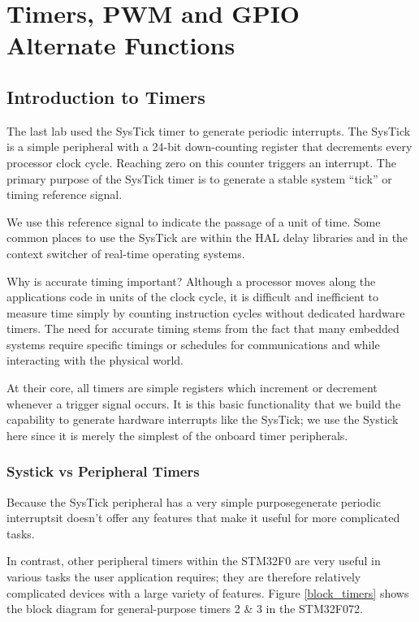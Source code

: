 \documentclass[openany,11pt,fleqn]{book} %
\begin{document}
	
\chapter{Timers, PWM and GPIO Alternate Functions}

\section{Introduction to Timers}
The last lab used the SysTick timer to generate periodic interrupts. The SysTick is a simple peripheral with a 24-bit down-counting register that decrements every processor clock cycle. Reaching zero on this counter triggers an interrupt. The primary purpose of the SysTick timer is to generate a stable system ``tick'' or timing reference signal. 

We use this reference signal to indicate the passage of a unit of time. Some common places to use the SysTick are within the HAL delay libraries and in the context switcher of real-time operating systems. 

Why is accurate timing important? Although a processor moves along the applications code in units of the clock cycle, it is difficult and inefficient to measure time simply by counting instruction cycles without dedicated hardware timers. The need for accurate timing stems from the fact that many embedded systems require specific timings or schedules for communications and while interacting with the physical world.

At their core, all timers are simple registers which increment or decrement whenever a trigger signal occurs. It is this basic functionality that we build the capability to generate hardware interrupts like the SysTick; we use the Systick here since it is merely the simplest of the onboard timer peripherals.
    
    \subsection{Systick vs Peripheral Timers}
     Because the SysTick peripheral has a very simple purpose\textemdash generate periodic interrupts\textemdash it doesn't offer any features that make it useful for more complicated tasks. 
     
     In contrast, other peripheral timers within the STM32F0 are very useful in various tasks the user application requires; they are therefore relatively complicated devices with a large variety of features. Figure \ref{block_timers} shows the block diagram for general-purpose timers 2 \& 3 in the STM32F072.  
\end{document}
